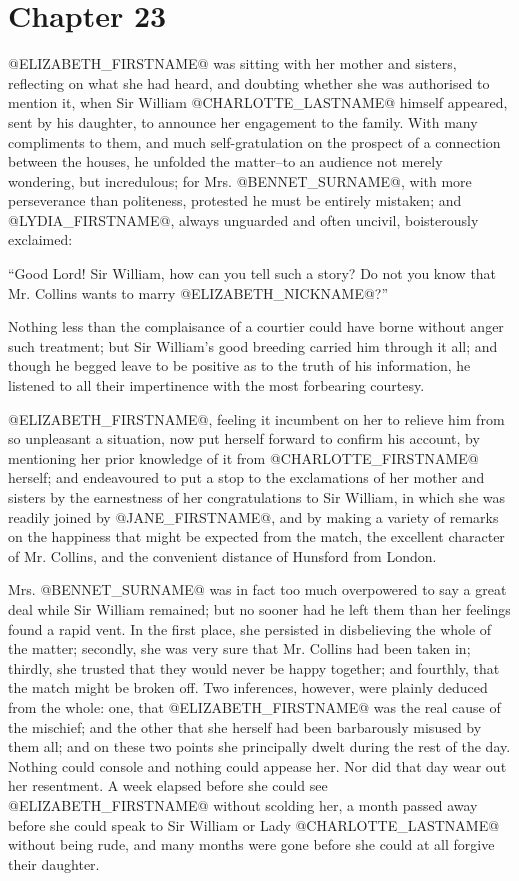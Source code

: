 \chapter*{Chapter 23}


@ELIZABETH_FIRSTNAME@ was sitting with her mother and sisters, reflecting on what
she had heard, and doubting whether she was authorised to mention
it, when Sir William @CHARLOTTE_LASTNAME@ himself appeared, sent by his daughter, to
announce her engagement to the family. With many compliments to them,
and much self-gratulation on the prospect of a connection between the
houses, he unfolded the matter--to an audience not merely wondering, but
incredulous; for Mrs. @BENNET_SURNAME@, with more perseverance than politeness,
protested he must be entirely mistaken; and @LYDIA_FIRSTNAME@, always unguarded and
often uncivil, boisterously exclaimed:

``Good Lord! Sir William, how can you tell such a story? Do not you know
that Mr. Collins wants to marry @ELIZABETH_NICKNAME@?''

Nothing less than the complaisance of a courtier could have borne
without anger such treatment; but Sir William's good breeding carried
him through it all; and though he begged leave to be positive as to the
truth of his information, he listened to all their impertinence with the
most forbearing courtesy.

@ELIZABETH_FIRSTNAME@, feeling it incumbent on her to relieve him from so unpleasant
a situation, now put herself forward to confirm his account, by
mentioning her prior knowledge of it from @CHARLOTTE_FIRSTNAME@ herself; and
endeavoured to put a stop to the exclamations of her mother and sisters
by the earnestness of her congratulations to Sir William, in which she
was readily joined by @JANE_FIRSTNAME@, and by making a variety of remarks on the
happiness that might be expected from the match, the excellent character
of Mr. Collins, and the convenient distance of Hunsford from London.

Mrs. @BENNET_SURNAME@ was in fact too much overpowered to say a great deal while
Sir William remained; but no sooner had he left them than her feelings
found a rapid vent. In the first place, she persisted in disbelieving
the whole of the matter; secondly, she was very sure that Mr. Collins
had been taken in; thirdly, she trusted that they would never be
happy together; and fourthly, that the match might be broken off. Two
inferences, however, were plainly deduced from the whole: one, that
@ELIZABETH_FIRSTNAME@ was the real cause of the mischief; and the other that she
herself had been barbarously misused by them all; and on these two
points she principally dwelt during the rest of the day. Nothing could
console and nothing could appease her. Nor did that day wear out her
resentment. A week elapsed before she could see @ELIZABETH_FIRSTNAME@ without
scolding her, a month passed away before she could speak to Sir William
or Lady @CHARLOTTE_LASTNAME@ without being rude, and many months were gone before she
could at all forgive their daughter.

